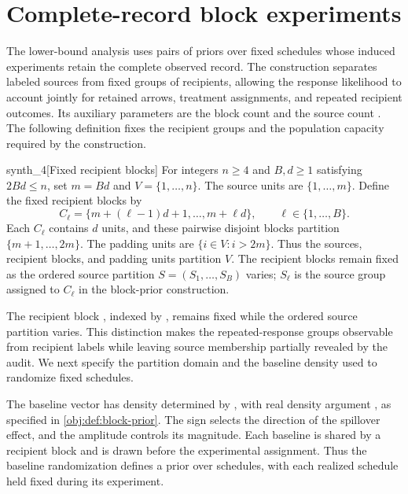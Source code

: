 \documentclass[11pt]{article}
\begin{document}
\section{Complete-record block experiments}

The lower-bound analysis uses pairs of priors over fixed schedules whose induced experiments retain the complete observed record. The construction separates labeled sources from fixed groups of recipients, allowing the response likelihood to account jointly for retained arrows, treatment assignments, and repeated recipient outcomes. Its auxiliary parameters are the block count  and the source count . The following definition fixes the recipient groups and the population capacity required by the construction.

\begin{definitionv}{synth_4}[Fixed recipient blocks]
For integers \(n\ge4\) and \(B,d\ge1\) satisfying \(2Bd\le n\), set \(m=Bd\) and \(V=\{1,\ldots,n\}\). The source units are \(\{1,\ldots,m\}\). Define the fixed recipient blocks by
\[
C_\ell=\{m+(\ell-1)d+1,\ldots,m+\ell d\},
\qquad \ell\in\{1,\ldots,B\}.
\]
Each \(C_\ell\) contains \(d\) units, and these pairwise disjoint blocks partition \(\{m+1,\ldots,2m\}\). The padding units are \(\{i\in V:i>2m\}\). Thus the sources, recipient blocks, and padding units partition \(V\). The recipient blocks remain fixed as the ordered source partition \(S=(S_1,\ldots,S_B)\) varies; \(S_\ell\) is the source group assigned to \(C_\ell\) in the block-prior construction.
\end{definitionv}

The recipient block , indexed by , remains fixed while the ordered source partition  varies. This distinction makes the repeated-response groups observable from recipient labels while leaving source membership partially revealed by the audit. We next specify the partition domain and the baseline density used to randomize fixed schedules.



The baseline vector  has density determined by , with real density argument , as specified in \cref{obj:def:block-prior}. The sign  selects the direction of the spillover effect, and the amplitude  controls its magnitude. Each baseline is shared by a recipient block and is drawn before the experimental assignment. Thus the baseline randomization defines a prior over schedules, with each realized schedule held fixed during its experiment.
\end{document}

